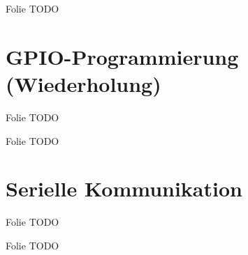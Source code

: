 \begin{frame}{Folie}
    TODO
\end{frame}

\section{GPIO-Programmierung (Wiederholung)}

\begin{frame}{Folie}
    TODO
\end{frame}

\begin{frame}{Folie}
    TODO
\end{frame}

\section{Serielle Kommunikation}

\begin{frame}{Folie}
    TODO
\end{frame}

\begin{frame}{Folie}
    TODO
\end{frame}
